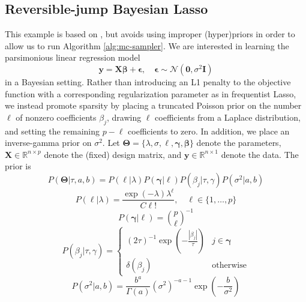 \documentclass[a4paper,12pt]{article}
\begin{document}
\subsection{Reversible-jump Bayesian Lasso}
This example is based on \cite{chen_bayesian_2011}, but avoids using improper (hyper)priors in order to allow us to run Algorithm \ref{alg:mc-sampler}. We are interested in learning the parsimonious linear regression model
\begin{equation}
  \mathbf{y} = \mathbf{X}\mathbf{\beta} + \mathbf{\epsilon}, \quad \mathbf{\epsilon} \sim \mathcal{N}(\mathbf{0}, \sigma^{2} \mathbf{I})
\end{equation}
in a Bayesian setting. Rather than introducing an L1 penalty to the objective function with a corresponding regularization parameter as in frequentist Lasso, we instead promote sparsity by placing a truncated Poisson prior on the number $\ell$ of nonzero coefficients $\beta_{j}$, drawing $\ell$ coefficients from a Laplace distribution, and setting the remaining $p-\ell$ coefficients to zero. In addition, we place an inverse-gamma prior on $\sigma^{2}$. Let $\mathbf{\Theta} = \{\lambda, \sigma, \ell, \mathbf{\gamma}, \mathbf{\beta}\}$ denote the parameters, $\mathbf{X} \in \mathbb{R}^{n \times p}$ denote the (fixed) design matrix, and $\mathbf{y} \in \mathbb{R}^{n \times 1}$ denote the data. The prior is
\begin{equation}
  P(\mathbf{\Theta}|\tau, a, b ) = P(\ell|\lambda) P(\mathbf{\gamma}|\ell) P(\beta_{j} | \tau, \gamma) P(\sigma^{2} | a, b)
\end{equation}
\begin{equation}
  P(\ell|\lambda) = \frac{\exp{(-\lambda)} \lambda^{\ell}}{C\ell!}, \quad \ell \in \{1,\ldots, p\}
\end{equation}
\begin{equation}
  P(\mathbf{\gamma}|\ell) = {p\choose \ell}^{-1}
\end{equation}
\begin{equation}
  P(\beta_{j} | \tau, \gamma ) = \begin{cases} (2\tau)^{-1}\exp(-\frac{|\beta_{j}|}{\tau}) & j \in \mathbf{\gamma} \\ \delta(\beta_{j}) & \text{otherwise} \end{cases}
\end{equation}
\begin{equation}
    P(\sigma^{2} | a, b) = \frac{b^{a}}{\Gamma(a)} (\sigma^{2})^{-a-1} \exp{\left(-\frac{b}{\sigma^{2}}\right)}
\end{equation}
\end{document}

